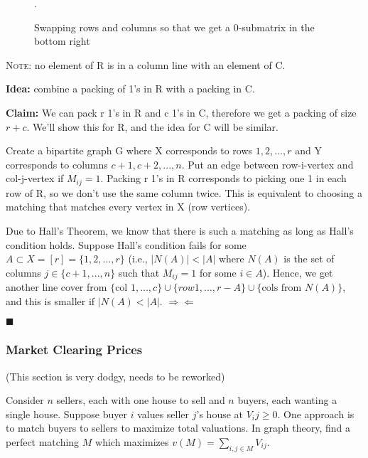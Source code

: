 \documentclass[11pt, letterpaper, oneside]{article}
\begin{document}
\begin{figure}[H]
{
		\label{swapped_matrix2}.
	}
	\caption{Swapping rows and columns so that we get a 0-submatrix in the bottom right}
\end{figure}

\textsc{Note:} no element of R is in a column line with an element of C.

\textbf{Idea:} combine a packing of 1's in R with a packing in C.

\textbf{Claim:} We can pack r 1's in R and c 1's in C, therefore we get a packing of size $r+c$. We'll show this for R, and the idea for C will be similar.

Create a bipartite graph G where X corresponds to rows $1, 2, ..., r$ and Y corresponds to columns $c+1, c+2, ..., n$. Put an edge between row-i-vertex and col-j-vertex if $M_{ij}=1$. Packing r 1's in R corresponds to picking one 1 in each row of R, so we don't use the same column twice. This is equivalent to choosing a matching that matches every vertex in X (row vertices).

Due to Hall's Theorem, we know that there is such a matching as long as Hall's condition holds. Suppose Hall's condition fails for some $A \subset X = [r] = \{1, 2, ..., r\}$ (i.e., $|N(A)|<|A|$ where $N(A)$ is the set of columns $j \in \{c+1, ..., n\}$ such that $M_{ij}=1$ for some $i \in A$). Hence, we get another line cover from $\{\text{col } 1, ..., c\} \cup \{row 1, ..., r-A\} \cup \{\text{cols from } N(A)\}$, and this is smaller if $|N(A) < |A|$. $\Rightarrow\Leftarrow$

{\hfill $\blacksquare$}

\subsubsection{Market Clearing Prices}
(This section is very dodgy, needs to be reworked)

Consider $n$ sellers, each with one house to sell and $n$ buyers, each wanting a single house. Suppose buyer $i$ values seller $j$'s house at $V_ij \geq 0$. One approach is to match buyers to sellers to maximize total valuations. In graph theory, find a perfect matching $M$ which maximizes $v(M) = \sum\limits_{i,j \in M} V_{ij}$.
\end{document}
